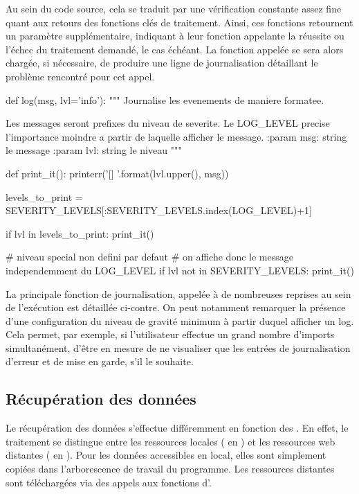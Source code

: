 Au sein du code source, cela se traduit par une vérification constante assez fine quant aux retours des fonctions clés de traitement. Ainsi, ces fonctions retournent un paramètre supplémentaire, indiquant à leur fonction appelante la réussite ou l'échec du traitement demandé, le cas échéant. La fonction appelée se sera alors chargée, si nécessaire, de produire une ligne de journalisation détaillant le problème rencontré pour cet appel.

\begin{Code}
  def log(msg, lvl='info'):
      """
      Journalise les evenements de maniere formatee.

      Les messages seront prefixes du niveau de severite.
      Le LOG_LEVEL precise l'importance moindre a partir de laquelle afficher le message.
      :param msg: string le message
      :param lvl: string le niveau
      """

      def print_it():
          printerr('[{}] {}'.format(lvl.upper(), msg))

      levels_to_print = SEVERITY_LEVELS[:SEVERITY_LEVELS.index(LOG_LEVEL)+1]

      if lvl in levels_to_print:
          print_it()

      # niveau special non defini par defaut
      # on affiche donc le message independemment du LOG_LEVEL
      if lvl not in SEVERITY_LEVELS:
          print_it()
\end{Code}

La principale fonction de journalisation, appelée à de nombreuses reprises au sein de l'exécution est détaillée ci-contre. On peut notamment remarquer la présence d'une configuration du niveau de gravité minimum à partir duquel afficher un log. Cela permet, par exemple, si l'utilisateur effectue un grand nombre d'imports simultanément, d'être en mesure de ne visualiser que les entrées de journalisation d'erreur et de mise en garde, s'il le souhaite.

  \subsection{Récupération des données}

Le récupération des données s'effectue différemment en fonction des . En effet, le traitement se distingue entre les ressources locales ( en ) et les ressources web distantes ( en ). Pour les données accessibles en local, elles sont simplement copiées dans l'arborescence de travail du programme. Les ressources distantes sont téléchargées via des appels aux fonctions d'.

